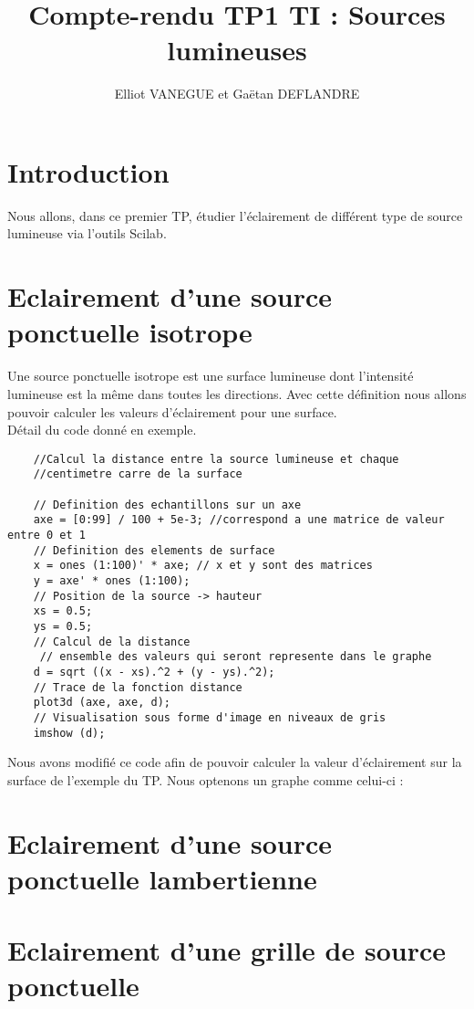 \documentclass{article}
\title{Compte-rendu TP1 TI : Sources lumineuses}
\author{Elliot VANEGUE et Gaëtan DEFLANDRE}
\begin{document}



  \maketitle
  
  \mbox{}
  \newpage
  \clearpage
  
  \section{Introduction}
  Nous allons, dans ce premier TP, étudier l'éclairement de différent type
  de source lumineuse via l'outils Scilab.
  
  \section{Eclairement d'une source ponctuelle isotrope}
  Une source ponctuelle isotrope est une surface lumineuse dont l'intensité lumineuse
  est la même dans toutes les directions. Avec cette définition nous allons pouvoir
  calculer les valeurs d'éclairement pour une surface.\\
  
  Détail du code donné en exemple.\\
  
  \begin{lstlisting}
    //Calcul la distance entre la source lumineuse et chaque
    //centimetre carre de la surface
  
    // Definition des echantillons sur un axe
    axe = [0:99] / 100 + 5e-3; //correspond a une matrice de valeur entre 0 et 1 
    // Definition des elements de surface
    x = ones (1:100)' * axe; // x et y sont des matrices
    y = axe' * ones (1:100);
    // Position de la source -> hauteur
    xs = 0.5;
    ys = 0.5;
    // Calcul de la distance
     // ensemble des valeurs qui seront represente dans le graphe
    d = sqrt ((x - xs).^2 + (y - ys).^2);
    // Trace de la fonction distance
    plot3d (axe, axe, d);
    // Visualisation sous forme d'image en niveaux de gris
    imshow (d);
  \end{lstlisting}
  
  Nous avons modifié ce code afin de pouvoir calculer la valeur d'éclairement sur la 
  surface de l'exemple du TP. Nous optenons un graphe comme celui-ci :
  

  \section{Eclairement d'une source ponctuelle lambertienne}
  
  
  \section{Eclairement d'une grille de source ponctuelle}
    
\end{document}
